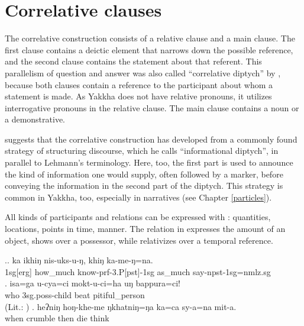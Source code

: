 \section{Correlative clauses}\label{correlative}

The correlative construction consists of a relative clause and a main clause. The first clause contains  a deictic element that narrows down the possible reference, and the second clause contains the statement about that referent. This parallelism of question and answer was also called  “correlative diptych” by \citet{Lehmann1988Towards}, because both clauses contain a reference to the participant about whom a statement is made. As Yakkha does not have relative pronouns, it utilizes interrogative pronouns in the relative clause. The main clause contains a noun or a demonstrative. 

\citet[25]{Bickel1999Principles} suggests that the correlative construction has developed from a commonly found strategy of structuring discourse, which he calls “informational diptych”, in parallel to Lehmann's terminology. Here, too, the first part is used to announce the kind of information one would supply, often followed by a  marker, before conveying the information in the second part of the diptych. This strategy is common in Yakkha, too, especially in narratives (see Chapter \ref{particles}). 

All kinds of participants and relations can be expressed with : quantities, locations, points in time, manner. The relation in  \Next[a] expresses the amount of an object, \Next[b] shows  over a possessor, while \Next[c] relativizes over a temporal reference.

\ex.\ag. ka  ikhiŋ  nis-uks-u-ŋ, khiŋ  ka-me-ŋ=na.\\
		{\sc 1sg[erg]} how\_much know{\sc -prf-3.P[pst]-1sg} as\_much say-{\sc npst-1sg=nmlz.sg}\\
		\bg.  isa=ga     u-cya=ci  mokt-u-ci=ha  uŋ  bappura=ci!\\
		who {\sc 3sg.poss-}child  beat  pitiful\_person\\
		 (Lit.: )
		\bg.  heʔniŋ  hoŋ-khe-me  ŋkhatniŋ=ŋa     ka=ca         sy-a=na                    mit-a.\\
		when crumble then  die think\\
		
